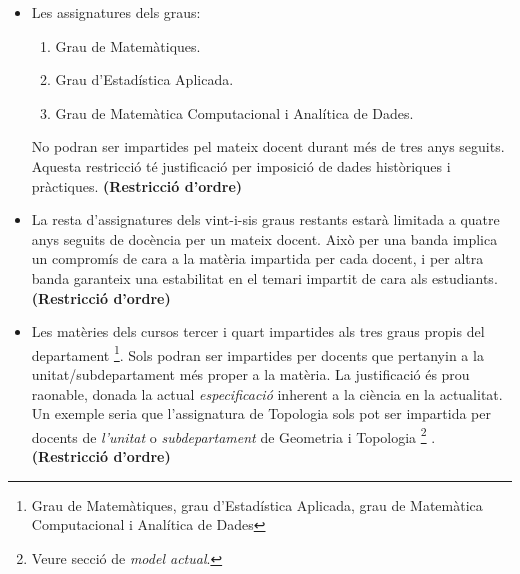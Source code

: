 \documentclass[10pt,twocolumn]{article}
\begin{document}
\begin{enumerate}
\begin{itemize}
		\item Les assignatures dels graus:
		\begin{enumerate} 
			\item Grau de Matemàtiques.
			\item Grau d'Estadística Aplicada.
			\item Grau de Matemàtica Computacional i Analítica de Dades.
		\end{enumerate}
		No podran ser impartides pel mateix docent durant més de tres anys seguits.
		{\color{gray} Aquesta restricció té justificació per imposició de dades històriques i pràctiques.} \textbf{(Restricció d'ordre)} 
		\item La resta d'assignatures dels vint-i-sis graus restants estarà limitada a quatre anys seguits de docència per un mateix docent. {\color{gray} Això per una banda implica un compromís de cara a la matèria impartida per cada docent, i per altra banda garanteix una estabilitat en el temari impartit de cara als estudiants.} \textbf{(Restricció d'ordre)} 
		\item  Les matèries  dels cursos tercer i quart impartides als tres graus propis del departament \footnote{Grau de Matemàtiques, grau d'Estadística Aplicada, grau de Matemàtica Computacional i Analítica de Dades}. Sols podran ser impartides per docents que pertanyin a la unitat/subdepartament més proper a la matèria.   {\color{gray} La justificació és prou raonable, donada la actual \textit{especificació} inherent a la ciència en la actualitat. Un exemple seria que l'assignatura de Topologia sols pot ser impartida per docents de \textit{l'unitat} o \textit{subdepartament} de Geometria i Topologia \footnote{Veure secció de  \textit{model actual}.} .} \textbf{(Restricció d'ordre)} 
	\end{itemize}
\end{enumerate}								
\footnotesize


\end{document}
